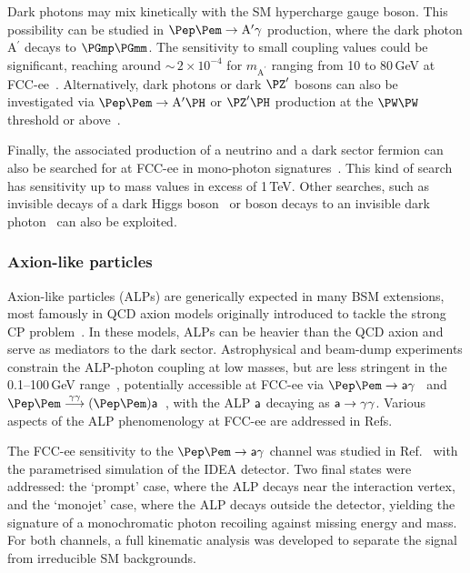 Dark photons may mix kinetically with the SM hypercharge gauge boson. 
This possibility can be studied in $\epem \to \mathrm{A}^\prime \gamma$ production, 
where the dark photon A$^\prime$ decays to $\PGmp\PGmm$. 
The sensitivity to small coupling values could be significant, 
reaching around $\sim$\,$2 \times 10^{-4}$ for $m_\mathrm{A^\prime}$ ranging from 10 to 80\,GeV at FCC-ee~\cite{Karliner:2015tga}. 
Alternatively, dark photons or dark $\PZ^\prime$ bosons can also be investigated 
via $\epem \to \mathrm{A}^\prime \PH$ or $\PZ^\prime \PH$ production at the $\PW\PW$ threshold or above~\cite{Giffin:2020jtl}.

Finally, the associated production of a neutrino and a dark sector fermion can also be searched for at FCC-ee 
in mono-photon signatures~\cite{Ge:2023wye}. 
This kind of search has sensitivity up to mass values in excess of 1\,TeV. 
Other searches, such as invisible decays of a dark Higgs boson~\cite{Haghighat:2022qyh}
or \PZ boson decays to an invisible dark photon~\cite{Cobal:2020hmk} can also be exploited.

\subsubsection{Axion-like particles}
\label{sec:alps}

Axion-like particles (ALPs) are generically expected in many BSM extensions, 
most famously in QCD axion models originally introduced to tackle the strong CP problem~\cite{Bauer:2018uxu}. 
In these models, ALPs can be heavier than the QCD axion and serve as mediators to the dark sector. 
Astrophysical and beam-dump experiments constrain the ALP-photon coupling at low masses, 
but are less stringent in the 0.1--100\,GeV range~\cite{Agrawal:2021dbo,dEnterria:2021ljz}, 
potentially accessible at FCC-ee via $\epem \to \axion \gamma$~\cite{Bauer:2018uxu} 
and $\epem \overset{\gamma\gamma}{\longrightarrow} (\epem) \axion$~\cite{RebelloTeles:2023uig}, 
with the ALP $\textsf{a}$ decaying as $\textsf{a} \to \gamma\gamma$. 
Various aspects of the ALP phenomenology at FCC-ee are addressed 
in Refs.~\cite{Cheung:2023nzg,Calibbi:2022izs,Liu:2022tqn,Zhang:2021sio}

The FCC-ee sensitivity to the $\epem \to \axion \gamma$ channel was studied in Ref.~\cite{note_ALP_Polesello} 
with the parametrised simulation of the IDEA detector.
Two final states were addressed: 
the `prompt' case, where the ALP decays near the interaction vertex, 
and the `monojet' case, where the ALP decays outside the detector, 
yielding the signature of a monochromatic photon recoiling against missing energy and mass. 
For both channels, a full kinematic analysis was developed to separate the signal from irreducible SM backgrounds.

